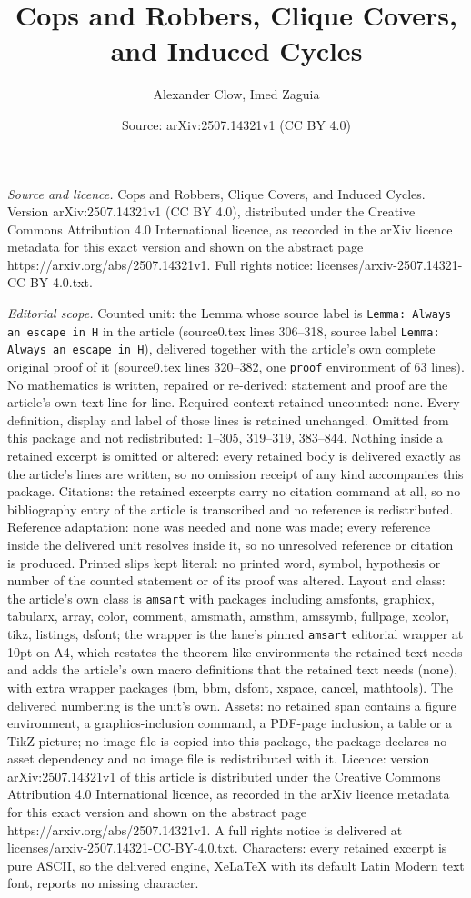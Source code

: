 \documentclass[10pt,a4paper]{amsart}
\title[Cops and Robbers, Clique Covers, and Induced Cycles]{Cops and Robbers, Clique Covers, and Induced Cycles}
\author{Alexander Clow, Imed Zaguia}
\date{Source: arXiv:2507.14321v1 (CC BY 4.0)}
\begin{document}
\maketitle

\noindent\emph{Source and licence.} Cops and Robbers, Clique Covers, and Induced Cycles. Version arXiv:2507.14321v1 (CC BY 4.0), distributed under the Creative Commons Attribution 4.0 International licence, as recorded in the arXiv licence metadata for this exact version and shown on the abstract page https://arxiv.org/abs/2507.14321v1. Full rights notice: licenses/arxiv-2507.14321-CC-BY-4.0.txt.\par\smallskip

\noindent\textit{Editorial scope.} Counted unit: the Lemma whose source label is \texttt{Lemma: Always an escape in H} in the article (source0.tex lines 306--318, source label \texttt{Lemma: Always an escape in H}), delivered together with the article's own complete original proof of it (source0.tex lines 320--382, one \texttt{proof} environment of 63 lines). No mathematics is written, repaired or re-derived: statement and proof are the article's own text line for line. Required context retained uncounted: none. Every definition, display and label of those lines is retained unchanged. Omitted from this package and not redistributed: 1--305, 319--319, 383--844. Nothing inside a retained excerpt is omitted or altered: every retained body is delivered exactly as the article's lines are written, so no omission receipt of any kind accompanies this package. Citations: the retained excerpts carry no citation command at all, so no bibliography entry of the article is transcribed and no reference is redistributed. Reference adaptation: none was needed and none was made; every reference inside the delivered unit resolves inside it, so no unresolved reference or citation is produced. Printed slips kept literal: no printed word, symbol, hypothesis or number of the counted statement or of its proof was altered. Layout and class: the article's own class is \texttt{amsart} with packages including amsfonts, graphicx, tabularx, array, color, comment, amsmath, amsthm, amssymb, fullpage, xcolor, tikz, listings, dsfont; the wrapper is the lane's pinned \texttt{amsart} editorial wrapper at 10pt on A4, which restates the theorem-like environments the retained text needs and adds the article's own macro definitions that the retained text needs (none), with extra wrapper packages (bm, bbm, dsfont, xspace, cancel, mathtools). The delivered numbering is the unit's own. Assets: no retained span contains a figure environment, a graphics-inclusion command, a PDF-page inclusion, a table or a TikZ picture; no image file is copied into this package, the package declares no asset dependency and no image file is redistributed with it. Licence: version arXiv:2507.14321v1 of this article is distributed under the Creative Commons Attribution 4.0 International licence, as recorded in the arXiv licence metadata for this exact version and shown on the abstract page https://arxiv.org/abs/2507.14321v1. A full rights notice is delivered at licenses/arxiv-2507.14321-CC-BY-4.0.txt. Characters: every retained excerpt is pure ASCII, so the delivered engine, XeLaTeX with its default Latin Modern text font, reports no missing character.
\end{document}

